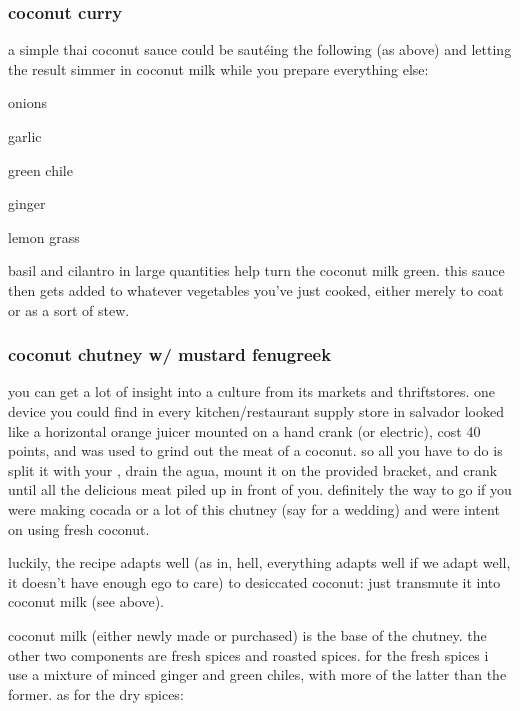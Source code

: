 \subsubsection{coconut curry}

a simple thai coconut sauce could be saut\'{e}ing the following (as above) and 
letting the result simmer in coconut milk while you prepare everything else:

\begin{ingredients}
  \item onions
  \item garlic
  \item green chile
  \item ginger
  \item lemon grass
\end{ingredients}

basil and cilantro in large quantities help turn the coconut milk green. this 
sauce then gets added to whatever vegetables you've just cooked, either merely 
to coat or as a sort of stew.

\subsubsection{coconut chutney w/ mustard fenugreek}

you can get a lot of insight into a culture from its markets and thriftstores. 
one device you could find in every kitchen/restaurant supply store in salvador 
looked like a horizontal orange juicer mounted on a hand crank (or electric), 
cost 40 points, and was used to grind out the meat of a coconut. so all you 
have to do is split it with your , drain the agua, mount it on the provided bracket, and crank 
until all the delicious meat piled up in front of you. definitely the way to 
go if you were making \gls{cocada} or a lot of this chutney (say for a wedding) and were intent 
on using fresh coconut.

luckily, the recipe adapts well (as in, hell, everything adapts well if we 
adapt well, it doesn't have enough ego to care) to desiccated coconut: just 
transmute it into coconut milk (see above).

coconut milk (either newly made or purchased) is the base of the chutney. the 
other two components are fresh spices and roasted spices. for the fresh spices 
i use a mixture of minced ginger and green chiles, with more of the latter 
than the former. as for the dry spices:

